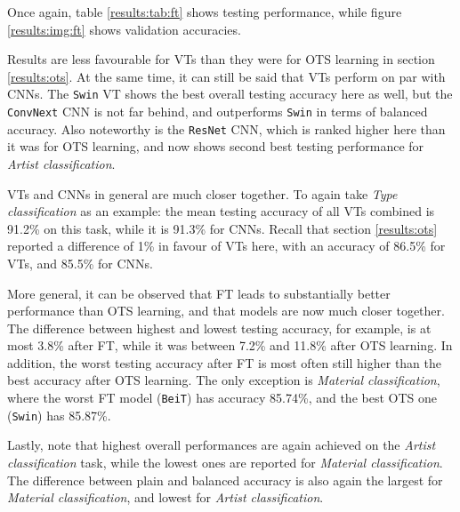Once again, table \ref{results:tab:ft} shows testing performance, while figure \ref{results:img:ft} shows validation accuracies.

Results are less favourable for VTs than they were for OTS learning in section \ref{results:ots}. At the same time, it can still be said that VTs perform on par with CNNs. The \texttt{Swin} VT shows the best overall testing accuracy here as well, but the \texttt{ConvNext} CNN is not far behind, and outperforms \texttt{Swin} in terms of balanced accuracy. Also noteworthy is the \texttt{ResNet} CNN, which is ranked higher here than it was for OTS learning, and now shows second best testing performance for \textit{Artist classification}.

VTs and CNNs in general are much closer together. To again take \textit{Type classification} as an example: the mean testing accuracy of all VTs combined is 91.2\% on this task, while it is 91.3\% for CNNs. Recall that section \ref{results:ots} reported a difference of 1\% in favour of VTs here, with an accuracy of 86.5\% for VTs, and 85.5\% for CNNs.

More general, it can be observed that FT leads to substantially better performance than OTS learning, and that models are now much closer together. The difference between highest and lowest testing accuracy, for example, is at most 3.8\% after FT, while it was between 7.2\% and 11.8\% after OTS learning. In addition, the worst testing accuracy after FT is most often still higher than the best accuracy after OTS learning. The only exception is \textit{Material classification}, where the worst FT model (\texttt{BeiT}) has accuracy 85.74\%, and the best OTS one (\texttt{Swin}) has 85.87\%.

Lastly, note that highest overall performances are again achieved on the \textit{Artist classification} task, while the lowest ones are reported for \textit{Material classification}. The difference between plain and balanced accuracy is also again the largest for \textit{Material classification}, and lowest for \textit{Artist classification}.



